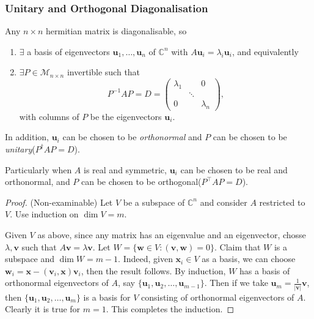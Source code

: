 \documentclass[a4paper]{article}
\begin{document}
    \subsubsection{Unitary and Orthogonal Diagonalisation}
    \begin{theorem}\label{thm:all hermitians are diag}
      Any $n\times n$ hermitian matrix is diagonalisable, so
      \begin{enumerate}
        \item $ \exists $ a basis of eigenvectors $
          \mathbf{u}_1,\dots,\mathbf{u}_n $ of $ \mathbb{C}^{n} $
          with $ A\mathbf{u}_i=\lambda_i\mathbf{u}_i $, and equivalently
        \item $ \exists P\in \mathcal{M}_{n\times n} $ invertible such that
          \[
            P^{-1}AP=D=
            \begin{pmatrix}
              \lambda_1&&0\\
              &\ddots&\\
              0&&\lambda_n
            \end{pmatrix},
          \]
          with columns of $P$ be the eigenvectors $\mathbf{u}_i$.
      \end{enumerate}
      In addition, $\mathbf{u}_i$ can be chosen to be
      \textit{orthonormal} and $P$ can be chosen to be
      \textit{unitary}($ P^\dagger AP=D $).

      Particularly when $A$ is real and symmetric, $ \mathbf{u}_i $
      can be chosen to be real and orthonormal, and $P$ can be chosen
      to be orthogonal($ P^{\top}AP=D $).
    \end{theorem}
    \begin{proof}(Non-examinable)
      Let $V$ be a subspace of $ \mathbb{C}^{n} $ and consider $A$
      restricted to $V$. Use induction on $\dim V=m$.

      Given $V$ as above, since any matrix has an eigenvalue and an
      eigenvector, chosse $ \lambda,\mathbf{v} $ such that $
      A\mathbf{v}=\lambda\mathbf{v} $. Let $ W = \{\mathbf{w}\in V:
      (\mathbf{v},\mathbf{w})=0\} $. Claim that $W$ is a subspace and
      $\dim W=m-1$. Indeed, given $ \mathbf{x}_i\in V $ as a basis,
      we can choose $
      \mathbf{w}_i=\mathbf{x}-(\mathbf{v}_i,\mathbf{x})\mathbf{v}_i
      $, then the result follows. By induction, $W$ has a basis of
      orthonormal eigenvectors of $A$, say $
      \{\mathbf{u}_1,\mathbf{u}_2,\dots,\mathbf{u}_{m-1}\} $. Then if
      we take $ \mathbf{u}_m = \frac{1}{|\mathbf{v}|}\mathbf{v} $,
      then $\{\mathbf{u}_1,\mathbf{u}_2,\dots,\mathbf{u}_{m}\}$ is a
      basis for $V$ consisting of orthonormal eigenvectors of $A$.
      Clearly it is true for $m=1$. This completes the induction.
    \end{proof}
\end{document}
